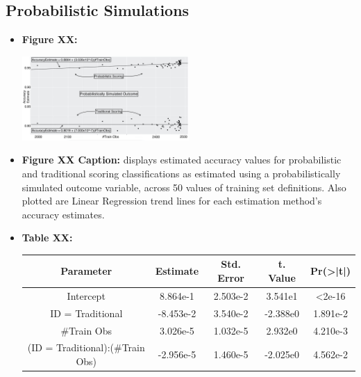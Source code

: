 \documentclass[12pt,]{article}
\begin{document}
\hypertarget{probabilistic-simulations}{%
\subsection{Probabilistic Simulations}\label{probabilistic-simulations}}

\begin{itemize}
\item
  \textbf{Figure XX:}

  \begin{center}
  \includegraphics[width=0.5\textwidth]{Sup2Graph.jpg}
  \end{center}
\item
  \textbf{Figure XX Caption:} displays estimated accuracy values for
  probabilistic and traditional scoring classifications as estimated
  using a probabilistically simulated outcome variable, across 50 values
  of training set definitions. Also plotted are Linear Regression trend
  lines for each estimation method's accuracy estimates.
\item
  \textbf{Table XX:}

  \begin{center}
  \begin{tabular}{|c|c|c|c|c|}
  \hline
  Parameter                      & Estimate  & Std. Error & t. Value  & Pr(>|t|) \\
  \hline
  \hline
  Intercept                      &  8.864e-1 &  2.503e-2  &  3.541e1  & <2e-16   \\                             
  \hline
  ID = Traditional               & -8.453e-2 &  3.540e-2  & -2.388e0  & 1.891e-2 \\
  \hline
  \#Train Obs                    &  3.026e-5 &  1.032e-5  &  2.932e0  & 4.210e-3 \\
  \hline
  (ID = Traditional):(\#Train Obs) &  -2.956e-5 &  1.460e-5  &  -2.025e0 & 4.562e-2 \\
  \hline
  \end{tabular}
  \end{center}


\end{itemize}
\end{document}
